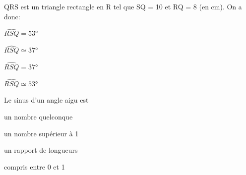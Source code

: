 \begin{QCM}
\begin{GroupeQCM}
        \begin{exercice}
      QRS est un triangle rectangle en R tel que SQ = 10 et RQ = 8 (en cm). On a donc:
      \begin{ChoixQCM}{4}
      \item $\widehat{RSQ}=53$°
      \item $\widehat{RSQ} \simeq 37$°
      \item $\widehat{RSQ}= 37$°
      \item $\widehat{RSQ} \simeq 53$°
      \end{ChoixQCM}
\begin{corrige}
   \end{corrige}
    \end{exercice}
    
        \begin{exercice}
      Le sinus d'un angle aigu est
      \begin{ChoixQCM}{4}
      \item un nombre quelconque
      \item un nombre supérieur à 1
      \item un rapport de longueurs
      \item compris entre 0 et 1
      \end{ChoixQCM}
\begin{corrige}
   \end{corrige}
    \end{exercice}


\end{GroupeQCM}
\end{QCM}

  